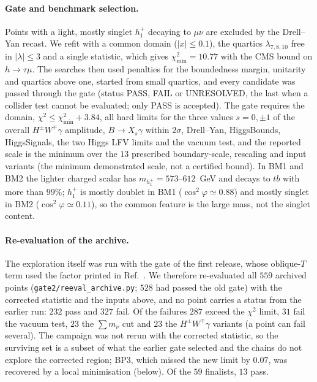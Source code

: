 \documentclass[twocolumn,epjc3]{svjour3}
\newcommand{\HG}{Ref.~\cite{HerreroGarcia:2017xdq}}
\begin{document}
\paragraph{Gate and benchmark selection.} Points with a light, mostly singlet $h_1^+$ decaying to $\mu\nu$ are excluded by the Drell--Yan recast. We refit with a common domain ($|x|\le0.1$), the quartics $\lambda_{7,8,10}$ free in $|\lambda|\le3$ and a single statistic, which gives $\chi^2_{\min}=10.77$ with the CMS bound on $h\to\tau\mu$. The searches then used penalties for the boundedness margin, unitarity and quartics above one, started from small quartics, and every candidate was passed through the gate (status PASS, FAIL or UNRESOLVED, the last when a collider test cannot be evaluated; only PASS is accepted). The gate requires the domain, $\chi^2\le\chi^2_{\min}+3.84$, all hard limits for the three values $s=0,\pm1$ of the overall $H^\pm W^\mp\gamma$ amplitude, $B\to X_s\gamma$ within $2\sigma$, Drell--Yan, HiggsBounds, HiggsSignals, the two Higgs LFV limits and the vacuum test, and the reported scale is the minimum over the $13$ prescribed boundary-scale, rescaling and input variants (the minimum demonstrated scale, not a certified bound). In BM1 and BM2 the lighter charged scalar has $m_{h_1^+}=573$--$612$~GeV and decays to $tb$ with more than $99\%$; $h_1^+$ is mostly doublet in BM1 ($\cos^2\varphi\simeq0.88$) and mostly singlet in BM2 ($\cos^2\varphi\simeq0.11$), so the common feature is the large mass, not the singlet content.

\paragraph{Re-evaluation of the archive.} The exploration itself was run with the gate of the first release, whose oblique-$T$ term used the factor printed in \HG{}. We therefore re-evaluated all $559$ archived points (\texttt{gate2/reeval\_archive.py}; $528$ had passed the old gate) with the corrected statistic and the inputs above, and no point carries a status from the earlier run: $232$ pass and $327$ fail. Of the failures $287$ exceed the $\chi^2$ limit, $31$ fail the vacuum test, $23$ the $\sum m_\nu$ cut and $23$ the $H^\pm W^\mp\gamma$ variants (a point can fail several). The campaign was not rerun with the corrected statistic, so the surviving set is a subset of what the earlier gate selected and the chains do not explore the corrected region; BP3, which missed the new limit by $0.07$, was recovered by a local minimisation (below). Of the $59$ finalists, $13$ pass.
\end{document}
